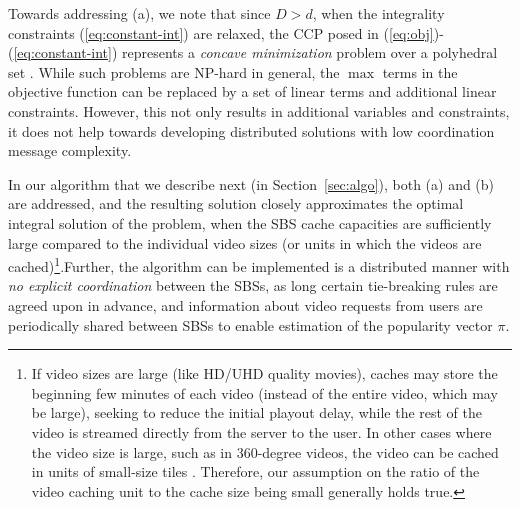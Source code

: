 \documentclass[conference]{IEEEtran}
\begin{document}
Towards addressing (a), we note that since $D > d$, when the integrality constraints (\ref{eq:constant-int}) are relaxed, the CCP posed in (\ref{eq:obj})-(\ref{eq:constant-int}) represents a \textit{concave minimization} problem over a polyhedral set \cite{Benson1995}. While such problems are NP-hard in general, the $\max$ terms in the objective function can be replaced by a set of linear terms and additional linear constraints. However, this not only results in additional variables and constraints, it does not help towards developing distributed solutions with low coordination message complexity. 




In our algorithm that we describe next (in Section~\ref{sec:algo}), both (a) and (b) are addressed, and the resulting solution closely approximates the optimal integral solution of the problem, when the SBS cache capacities are sufficiently large compared to the individual video sizes (or units in which the videos are cached)\footnote{If video sizes are large (like HD/UHD quality movies), caches may store the beginning few minutes of each video (instead of the entire video, which may be large), seeking to reduce the initial playout delay, while the rest of the video is streamed directly from the server to the user. In other cases where the video size is large, such as in 360-degree videos, the video can be cached in units of small-size tiles \cite{Chakareski:18}. Therefore, our assumption on the ratio of the video caching unit to the cache size being small generally holds true.}.Further, the algorithm can be implemented is a distributed manner with \textit{no explicit coordination} between the SBSs, as long certain tie-breaking rules are agreed upon in advance, and information about video requests from users are periodically shared between SBSs to enable estimation of the popularity vector $\pi$. 
\end{document}
